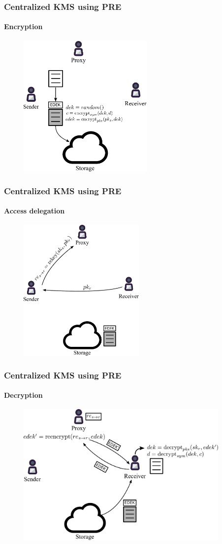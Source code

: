 \documentclass[xetex,mathsans,sans,aspectratio=169]{beamer}
\begin{document}
    \begin{frame}
        \frametitle{Centralized KMS using PRE}
        \framesubtitle{Encryption}
        \begin{figure}
            \centering
            \includegraphics[height=7cm]{pdf/encrypt.pdf}
        \end{figure}
    \end{frame}

    \begin{frame}
        \frametitle{Centralized KMS using PRE}
        \framesubtitle{Access delegation}
        \begin{figure}
            \centering
            \includegraphics[height=7cm]{pdf/delegate.pdf}
        \end{figure}
    \end{frame}

    \begin{frame}
        \frametitle{Centralized KMS using PRE}
        \framesubtitle{Decryption}
        \begin{figure}
            \centering
            \includegraphics[height=7cm]{pdf/decrypt.pdf}
        \end{figure}
    \end{frame}
\end{document}
